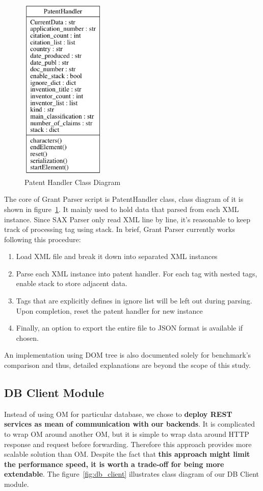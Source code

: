 \documentclass{article}
\begin{document}
\begin{figure}[H]
\centering
\includegraphics[width=40mm,scale=10]{handler.png}
\caption{Patent Handler Class Diagram} \label{fig:handler}
\end{figure}

The core of Grant Parser script is PatentHandler class, class diagram of it is shown in figure~\ref{fig:handler}. It mainly used to hold data that parsed from each XML instance. Since SAX Parser only read XML line by line, it's reasonable to keep track of processing tag using stack. In brief, Grant Parser currently works following this procedure:
\begin{enumerate}
 \item Load XML file and break it down into separated XML instances
 \item Parse each XML instance into patent handler. For each tag with nested tags, enable stack to store adjacent data.
 \item Tags that are explicitly defines in ignore list will be left out during parsing. Upon completion, reset the patent handler for new instance
 \item Finally, an option to export the entire file to JSON format is available if chosen.
\end{enumerate}

An implementation using DOM tree is also documented solely for benchmark's comparison and thus, detailed explanations are beyond the scope of this study.

\subsection{DB Client Module}
Instead of using OM for particular database, we chose to \textbf{deploy REST services as mean of communication with our backends}. It is complicated to wrap OM around another OM, but it is simple to wrap data around HTTP response and request before forwarding. Therefore this approach provides more scalable solution than OM. Despite the fact that \textbf{this approach might limit the performance speed, it is worth a trade-off for being more extendable}. The figure~\ref{fig:db_client} illustrates class diagram of our DB Client module.
\end{document}
